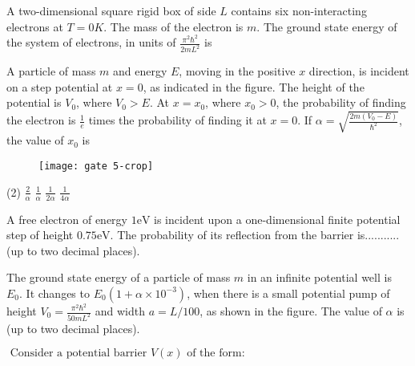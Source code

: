 \begin{enumerate}
\begin{minipage}{\textwidth}
\end{minipage}
\begin{minipage}{\textwidth}
	\item A two-dimensional square rigid box of side $L$ contains six non-interacting electrons at $T=0 K .$ The mass of the electron is $m .$ The ground state energy of the system of electrons, in units of $\frac{\pi^{2} \hbar^{2}}{2 m L^{2}}$ is
\end{minipage}
\begin{minipage}{\textwidth}
	\item A particle of mass $m$ and energy $E$, moving in the positive $x$ direction, is incident on a step potential at $x=0$, as indicated in the figure. The height of the potential is $V_{0}$, where $V_{0}>E$. At $x=x_{0}$, where $x_{0}>0$, the probability of finding the electron is $\frac{1}{e}$ times the probability of finding it at $x=0$. If $\alpha=\sqrt{\frac{2 m\left(V_{0}-E\right)}{\hbar^{2}}}$, the value of $x_{0}$ is
	\begin{figure}[H]
		\centering
		\texttt{[image: gate 5-crop]}
	\end{figure}
\end{minipage}
\begin{tasks}(2)
	\task[\textbf{A.}] $\frac{2}{\alpha}$
	\task[\textbf{B.}] $\frac{1}{\alpha}$
	\task[\textbf{C.}]$\frac{1}{2 \alpha}$
	\task[\textbf{D.}]$\frac{1}{4 \alpha}$
\end{tasks}
\begin{minipage}{\textwidth}
	\item A free electron of energy $1 \mathrm{eV}$ is incident upon a one-dimensional finite potential step of height $0.75 \mathrm{eV}$. The probability of its reflection from the barrier is........... (up to two decimal places).
\end{minipage}
\begin{minipage}{\textwidth}
	\item The ground state energy of a particle of mass $m$ in an infinite potential well is $E_{0} .$ It changes to $E_{0}\left(1+\alpha \times 10^{-3}\right)$, when there is a small potential pump of height $V_{0}=\frac{\pi^{2} \hbar^{2}}{50 m L^{2}}$ and width $a=L / 100$, as shown in the figure. The value of $\alpha$ is (up to two decimal places).
\end{minipage}
\begin{minipage}{\textwidth}
	\item $ \text { Consider a potential barrier } V(x) \text { of the form: }$

\end{minipage}
\end{enumerate}
